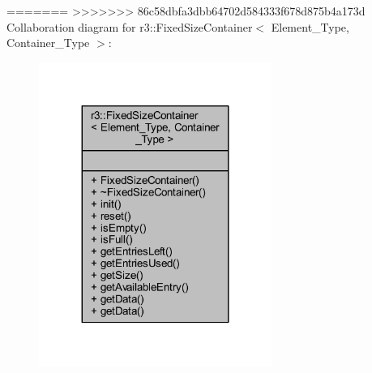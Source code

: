 =======
>>>>>>> 86c58dbfa3dbb64702d584333f678d875b4a173d
Collaboration diagram for r3\+:\+:Fixed\+Size\+Container$<$ Element\+\_\+\+Type, Container\+\_\+\+Type $>$\+:\nopagebreak
\begin{figure}[H]
\begin{center}
\leavevmode
\includegraphics[width=215pt]{classr3_1_1_fixed_size_container__coll__graph}
\end{center}
\end{figure}
